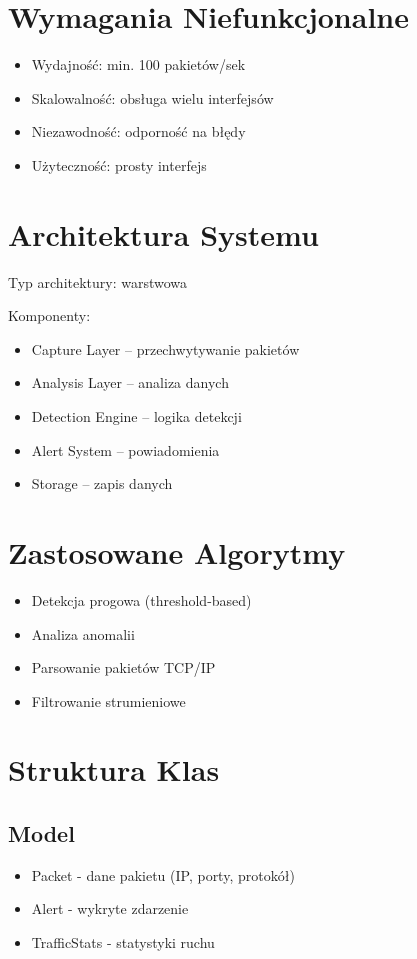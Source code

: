 \documentclass[a4paper,12pt]{article}
\begin{document}
	\section{Wymagania Niefunkcjonalne}
	\begin{itemize}
		\item Wydajność: min. 100 pakietów/sek
		\item Skalowalność: obsługa wielu interfejsów
		\item Niezawodność: odporność na błędy
		\item Użyteczność: prosty interfejs
	\end{itemize}
	
	\section{Architektura Systemu}
	Typ architektury: warstwowa
	
	Komponenty:
	\begin{itemize}
		\item Capture Layer – przechwytywanie pakietów
		\item Analysis Layer – analiza danych
		\item Detection Engine – logika detekcji
		\item Alert System – powiadomienia
		\item Storage – zapis danych
	\end{itemize}
	
	\section{Zastosowane Algorytmy}
	\begin{itemize}
		\item Detekcja progowa (threshold-based)
		\item Analiza anomalii
		\item Parsowanie pakietów TCP/IP
		\item Filtrowanie strumieniowe
	\end{itemize}
	
	\section{Struktura Klas}
	\subsection*{Model}
	\begin{itemize}
		\item Packet - dane pakietu (IP, porty, protokół)
		\item Alert - wykryte zdarzenie
		\item TrafficStats - statystyki ruchu
	\end{itemize}
	
\end{document}
